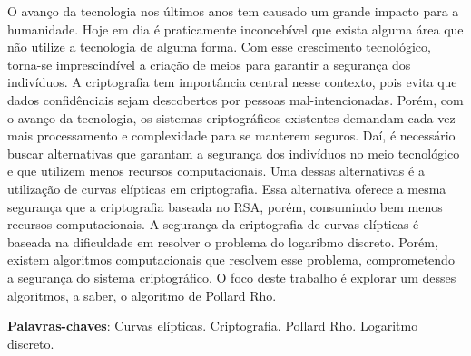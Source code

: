 \begin{resumo}
O avanço da tecnologia nos últimos anos tem causado um grande impacto para a humanidade. Hoje em dia é praticamente inconcebível que exista alguma área que não utilize a tecnologia de alguma forma. Com esse crescimento tecnológico, torna-se imprescindível a criação de meios para garantir a segurança dos indivíduos. A criptografia tem importância central nesse contexto, pois evita que dados confidênciais sejam descobertos por pessoas mal-intencionadas. Porém, com o avanço da tecnologia, os sistemas criptográficos existentes demandam cada vez mais processamento e complexidade para se manterem seguros. Daí, é necessário buscar alternativas que garantam a segurança dos indivíduos no meio tecnológico e que utilizem menos recursos computacionais. Uma dessas alternativas é a utilização de curvas elípticas em criptografia. Essa alternativa oferece a mesma segurança que a criptografia baseada no RSA, porém, consumindo bem menos recursos computacionais. A segurança da criptografia de curvas elípticas é baseada na dificuldade em resolver o problema do logaribmo discreto. Porém, existem algoritmos computacionais que resolvem esse problema, comprometendo a segurança  do sistema criptográfico. O foco deste trabalho é explorar um desses algoritmos, a saber, o algoritmo de Pollard Rho.

 \vspace{\onelineskip}
    
 \noindent
 \textbf{Palavras-chaves}: Curvas elípticas. Criptografia. Pollard Rho. Logaritmo discreto.
\end{resumo}
